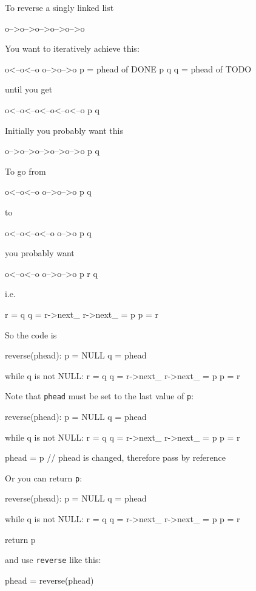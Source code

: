 To reverse a singly linked list
\begin{console}
    o-->o-->o-->o-->o-->o
\end{console}
You want to iteratively achieve this:
\begin{console}
    o<--o<--o   o-->o-->o    p = phead of DONE
            p   q            q = phead of TODO
\end{console}
until you get
\begin{console}
    o<--o<--o<--o<--o<--o
                        p   q
\end{console}
Initially you probably want this
\begin{console}
    o-->o-->o-->o-->o-->o
 p  q
\end{console}
To go from
\begin{console}
    o<--o<--o   o-->o-->o
            p   q
\end{console}
to
\begin{console}
    o<--o<--o<--o   o-->o
                p   q
\end{console}
you probably want
\begin{console}
    o<--o<--o   o-->o-->o
            p   r   q
\end{console}
i.e.
\begin{console}
    r = q
    q = r->next_
    r->next_ = p
    p = r
\end{console}
So the code is
\begin{console}
reverse(phead):
    p = NULL
    q = phead
    
    while q is not NULL:
        r = q
        q = r->next_
        r->next_ = p
        p = r
\end{console}
Note that \verb!phead! must be set to the last value of \verb!p!:
\begin{console}
reverse(phead):
    p = NULL
    q = phead
    
    while q is not NULL:
        r = q
        q = r->next_
        r->next_ = p
        p = r
    
    phead = p // phead is changed, therefore pass by reference
\end{console}
Or you can return \verb!p!:
\begin{console}
reverse(phead):
    p = NULL
    q = phead
    
    while q is not NULL:
        r = q
        q = r->next_
        r->next_ = p
        p = r
    
    return p
\end{console}
and use \verb!reverse! like this:
\begin{console}
phead = reverse(phead)
\end{console}

